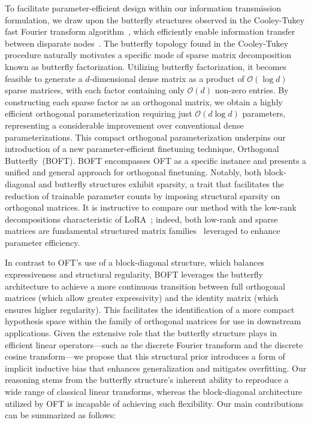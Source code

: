 To facilitate parameter-efficient design within our information transmission formulation, we draw upon the butterfly structures observed in the Cooley-Tukey fast Fourier transform algorithm~\cite{cooley1965algorithm}, which efficiently enable information transfer between disparate nodes~\cite{klasing1994broadcasting}. The butterfly topology found in the Cooley-Tukey procedure naturally motivates a specific mode of sparse matrix decomposition known as butterfly factorization. Utilizing butterfly factorization, it becomes feasible to generate a $d$-dimensional dense matrix as a product of $\mathcal{O}(\log d)$ sparse matrices, with each factor containing only $\mathcal{O}(d)$ non-zero entries. By constructing each sparse factor as an orthogonal matrix, we obtain a highly efficient orthogonal parameterization requiring just $\mathcal{O}(d\log d)$ parameters, representing a considerable improvement over conventional dense parameterizations. This compact orthogonal parameterization underpins our introduction of a new parameter-efficient finetuning technique, Orthogonal Butterfly~(BOFT). BOFT encompasses OFT as a specific instance and presents a unified and general approach for orthogonal finetuning. Notably, both block-diagonal and butterfly structures exhibit sparsity, a trait that facilitates the reduction of trainable parameter counts by imposing structural sparsity on orthogonal matrices. It is instructive to compare our method with the low-rank decompositions characteristic of LoRA~\cite{hulora2022}; indeed, both low-rank and sparse matrices are fundamental structured matrix families~\cite{candes2011robust} leveraged to enhance parameter efficiency.

In contrast to OFT's use of a block-diagonal structure, which balances expressiveness and structural regularity, BOFT leverages the butterfly architecture to achieve a more continuous transition between full orthogonal matrices (which allow greater expressivity) and the identity matrix (which ensures higher regularity). This facilitates the identification of a more compact hypothesis space within the family of orthogonal matrices for use in downstream applications. Given the extensive role that the butterfly structure plays in efficient linear operators—such as the discrete Fourier transform and the discrete cosine transform—we propose that this structural prior introduces a form of implicit inductive bias that enhances generalization and mitigates overfitting. Our reasoning stems from the butterfly structure's inherent ability to reproduce a wide range of classical linear transforms, whereas the block-diagonal architecture utilized by OFT is incapable of achieving such flexibility. Our main contributions can be summarized as follows:

